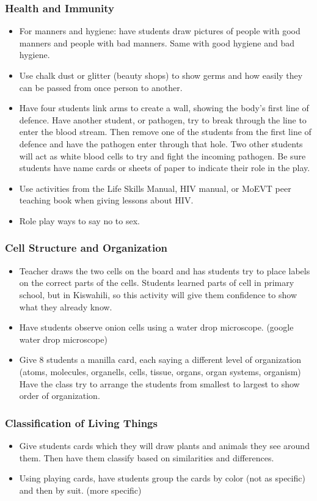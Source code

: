 \subsubsection{Health and Immunity}
\begin{itemize}
\item	For manners and hygiene: have students draw pictures of people with good manners and people with bad manners. Same with good hygiene and bad hygiene.
\item Use chalk dust or glitter (beauty shops) to show germs and how easily they can be passed from once person to another. 
\item Have four students link arms to create a wall, showing the body's first line of defence. Have another student, or pathogen, try to break through the line to enter the blood stream.  Then remove one of the students from the first line of defence and have the pathogen enter through that hole.  Two other students will act as white blood cells to try and fight the incoming pathogen.  Be sure students have name cards or sheets of paper to indicate their role in the play.
\item Use activities from the Life Skills Manual, HIV manual, or MoEVT peer teaching book when giving lessons about HIV.
\item Role play ways to say no to sex.
\end{itemize}

\subsubsection{Cell Structure and Organization}
\begin{itemize}
\item Teacher draws the two cells on the board and has students try to place labels on the correct parts of the cells.  Students learned parts of cell in primary school, but in Kiswahili, so this activity will give them confidence to show what they already know.
\item Have students observe onion cells using a water drop microscope. (google water drop microscope)
\item Give 8 students a manilla card, each saying a different level of organization (atoms, molecules, organells, cells, tissue, organs, organ systems, organism) Have the class try to arrange the students from smallest to largest to show order of organization.
\end{itemize}

\subsubsection{Classification of Living Things}
\begin{itemize}
\item	Give students cards which they will draw plants and animals they see around them.  Then have them classify based on similarities and differences.
\item Using playing cards, have students group the cards by color (not as specific) and then by suit. (more specific) 
\end{itemize}

